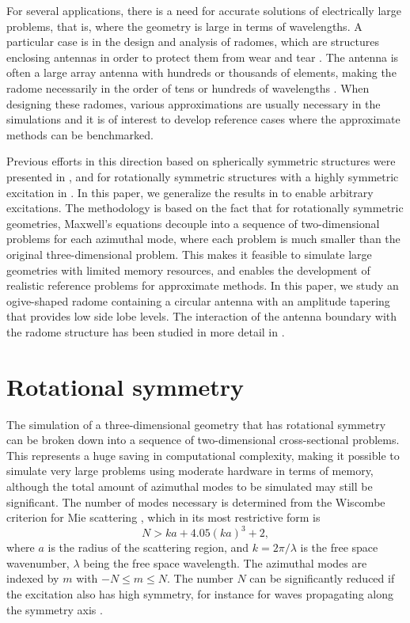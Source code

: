\documentclass[a4paper,12pt]{article}
\begin{document}
For several applications, there is a need for accurate solutions of
electrically large problems, that is, where the geometry is large in
terms of wavelengths. A particular case is in the design and analysis
of radomes, which are structures enclosing antennas in order to
protect them from wear and tear \cite{Kozakoff2010,Shavit2018}. The
antenna is often a large array antenna with hundreds or thousands of
elements, making the radome necessarily in the order of tens or
hundreds of wavelengths \cite{Poulsen2006}. When designing these
radomes, various approximations are usually necessary in the
simulations and it is of interest to develop reference cases where the
approximate methods can be benchmarked.

Previous efforts in this direction based on spherically symmetric
structures were presented in \cite{TEAT-7262,TEAT-7270}, and for
rotationally symmetric structures with a highly symmetric excitation
in \cite{TEAT-7273}. In this paper, we generalize the results in
\cite{TEAT-7273} to enable arbitrary excitations. The methodology is
based on the fact that for rotationally symmetric geometries,
Maxwell's equations decouple into a sequence of two-dimensional
problems for each azimuthal mode, where each problem is much smaller
than the original three-dimensional problem. This makes it feasible to
simulate large geometries with limited memory resources, and enables
the development of realistic reference problems for approximate
methods. In this paper, we study an ogive-shaped radome containing a
circular antenna with an amplitude tapering that provides low side
lobe levels. The interaction of the antenna boundary with the radome
structure has been studied in more detail in \cite{Sjoberg2024}.


\section{Rotational symmetry}
\label{sec:rotational}

The simulation of a three-dimensional geometry that has rotational
symmetry can be broken down into a sequence of two-dimensional
cross-sectional problems. This represents a huge saving in
computational complexity, making it possible to simulate very large
problems using moderate hardware in terms of memory, although the
total amount of azimuthal modes to be simulated may still be
significant. The number of modes necessary is determined from the
Wiscombe criterion for Mie scattering \cite{Wiscombe1980}, which in
its most restrictive form is
\begin{equation}
  N > ka + 4.05(ka)^{3} + 2,
\end{equation}
where $a$ is the radius of the scattering region, and
$k = 2\pi/\lambda$ is the free space wavenumber, $\lambda$
being the free space wavelength. The azimuthal modes are indexed by
$m$ with $-N\leq m\leq N$. The number $N$ can be significantly reduced
if the excitation also has high symmetry, for instance for waves
propagating along the symmetry axis \cite{TEAT-7273}.
\end{document}
